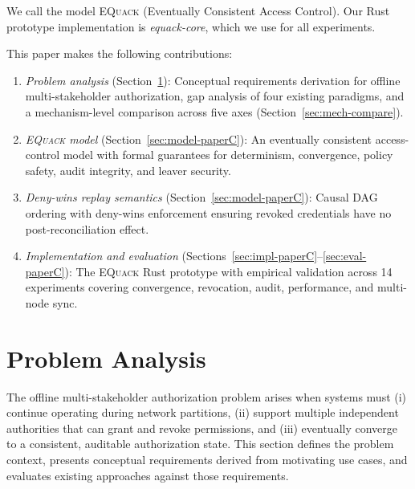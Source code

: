 \documentclass[10pt,journal,compsoc]{IEEEtran}
\newcommand{\equack}{\textsc{EQuack}}
\begin{document}
We call the model \equack{} (Eventually Consistent Access Control). Our Rust prototype implementation is \textit{equack-core}, which we use for all experiments.

This paper makes the following contributions:
  \begin{enumerate}
      \item \textit{Problem analysis} (Section~\ref{sec:problem-analysis-paperC}): Conceptual requirements derivation for offline multi-stakeholder authorization, gap analysis of four existing paradigms, and a mechanism-level comparison across five axes (Section~\ref{sec:mech-compare}).
      \item \textit{\equack{} model} (Section~\ref{sec:model-paperC}): An eventually consistent access-control model with formal guarantees for determinism, convergence, policy safety, audit integrity, and leaver security.
      \item \textit{Deny-wins replay semantics} (Section~\ref{sec:model-paperC}): Causal DAG ordering with deny-wins enforcement ensuring revoked credentials have no post-reconciliation effect.
      \item \textit{Implementation and evaluation} (Sections~\ref{sec:impl-paperC}--\ref{sec:eval-paperC}): The \equack{} Rust prototype with empirical validation across 14 experiments covering convergence, revocation, audit, performance, and multi-node sync.
  \end{enumerate}



\section{Problem Analysis}\label{sec:problem-analysis-paperC}

The offline multi-stakeholder authorization problem arises when systems must (i) continue operating during network partitions, (ii) support multiple independent authorities that can grant and revoke permissions, and (iii) eventually converge to a consistent, auditable authorization state. This section defines the problem context, presents conceptual requirements derived from motivating use cases, and evaluates existing approaches against those requirements.
\end{document}
